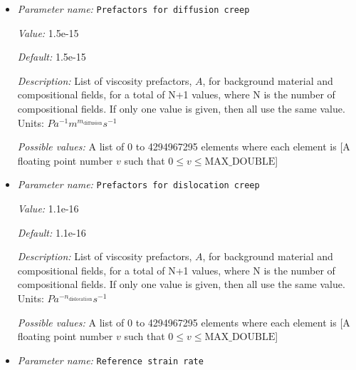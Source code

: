 \begin{itemize}
{\it Default:} 1.


{\it Description:} List of viscous strain weakening factors for background material and compositional fields, for a total of N+1 values, where N is the number of compositional fields. If only one value is given, then all use the same value.  Units: None


{\it Possible values:} A list of 0 to 4294967295 elements where each element is [A floating point number $v$ such that $0 \leq v \leq 1$]
\item {\it Parameter name:} {\tt Prefactors for diffusion creep}
\label{parameters:Material model/Visco Plastic/Prefactors for diffusion creep}
\label{parameters:Material_20model/Visco_20Plastic/Prefactors_20for_20diffusion_20creep}


{\it Value:} 1.5e-15


{\it Default:} 1.5e-15


{\it Description:} List of viscosity prefactors, $A$, for background material and compositional fields, for a total of N+1 values, where N is the number of compositional fields. If only one value is given, then all use the same value. Units: $Pa^{-1} m^{m_{\text{diffusion}}} s^{-1}$


{\it Possible values:} A list of 0 to 4294967295 elements where each element is [A floating point number $v$ such that $0 \leq v \leq \text{MAX\_DOUBLE}$]
\item {\it Parameter name:} {\tt Prefactors for dislocation creep}
\label{parameters:Material model/Visco Plastic/Prefactors for dislocation creep}
\label{parameters:Material_20model/Visco_20Plastic/Prefactors_20for_20dislocation_20creep}


{\it Value:} 1.1e-16


{\it Default:} 1.1e-16


{\it Description:} List of viscosity prefactors, $A$, for background material and compositional fields, for a total of N+1 values, where N is the number of compositional fields. If only one value is given, then all use the same value. Units: $Pa^{-n_{\text{dislocation}}} s^{-1}$


{\it Possible values:} A list of 0 to 4294967295 elements where each element is [A floating point number $v$ such that $0 \leq v \leq \text{MAX\_DOUBLE}$]
\item {\it Parameter name:} {\tt Reference strain rate}
\label{parameters:Material model/Visco Plastic/Reference strain rate}
\label{parameters:Material_20model/Visco_20Plastic/Reference_20strain_20rate}



\end{itemize}
